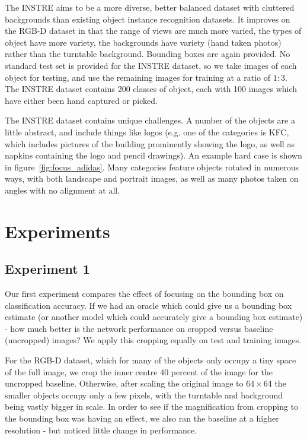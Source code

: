 The INSTRE \cite{Wang2015} aims to be a more diverse, better balanced dataset with cluttered backgrounds than existing object instance recognition datasets. It improves on the RGB-D dataset in that the range of views are much more varied, the types of object have more variety, the backgrounds have variety (hand taken photos) rather than the turntable background. Bounding boxes are again provided. No standard test set is provided for the INSTRE dataset, so we take images of each object for testing, and use the remaining images for training at a ratio of $1:3$. The INSTRE dataset contains 200 classes of object, each with 100 images which have either been hand captured or picked. 

The INSTRE dataset contains unique challenges. A number of the objects are a little abstract, and include things like logos (e.g. one of the categories is KFC, which includes pictures of the building prominently showing the logo, as well as napkins containing the logo and pencil drawings). An example hard case is shown in figure~\ref{fig:focus_adidas}. Many categories feature objects rotated in numerous ways, with both landscape and portrait images, as well as many photos taken on angles with no alignment at all.

\section {Experiments}


\subsection {Experiment 1}

Our first experiment compares the effect of focusing on the bounding box on classification accuracy. If we had an oracle which could give us a bounding box estimate (or another model which could accurately give a bounding box estimate) - how much better is the network performance on cropped versus baseline (uncropped) images? We apply this cropping equally on test and training images.

For the RGB-D dataset, which for many of the objects only occupy a tiny space of the full image, we crop the inner centre 40 percent of the image for the uncropped baseline. Otherwise, after scaling the original image to $ 64 \times 64 $ the smaller objects occupy only a few pixels, with the turntable and background being vastly bigger in scale. In order to see if the magnification from cropping to the bounding box was having an effect, we also ran the baseline at a higher resolution - but noticed little change in performance.


